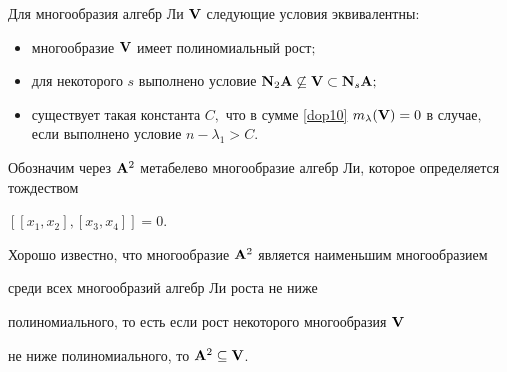 \begin{theorem}

Для многообразия алгебр Ли ${\bf V}$ следующие условия эквивалентны\/$:$





\begin{itemize}



\item[\rm (i)] многообразие ${\bf V}$ имеет полиномиальный рост$;$



\item[\rm (ii)] для некоторого $s$ выполнено условие ${\bf N}_2{\bf A} \not\subseteq {\bf V} \subset {\bf N}_s{\bf A};$



\item[\rm (iii)]  существует такая константа $C,$ что в сумме \eqref{dop10}  $m_\lambda({\bf V}) = 0$ в случае$,$ если выполнено условие $n - \lambda_1 > C.$





\end{itemize}



\end{theorem}



\smallskip



Обозначим через ${\bf A}^2$ метабелево многообразие алгебр Ли, которое определяется тождеством

$[[x_1,x_2],[x_3,x_4]]=0.$

Хорошо известно, что многообразие ${\bf A}^2$ является наименьшим многообразием

среди всех многообразий алгебр Ли роста не ниже

полиномиального, то есть если рост некоторого многообразия ${\bf V}$

не ниже полиномиального, то ${\bf A}^2 \subseteq {\bf V}$.








